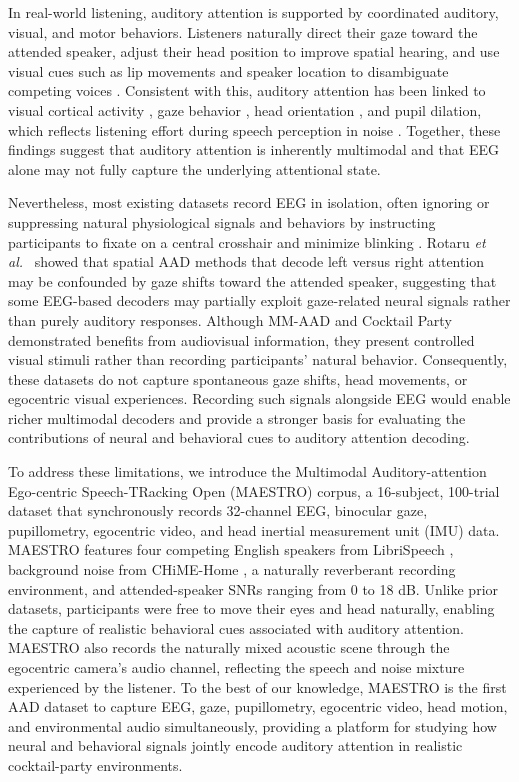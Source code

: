 \documentclass[journal]{IEEEtran}
\begin{document}
In real-world listening, auditory attention is supported by coordinated auditory, visual, and motor behaviors. Listeners naturally direct their gaze toward the attended speaker, adjust their head position to improve spatial hearing, and use visual cues such as lip movements and speaker location to disambiguate competing voices \cite{best2023effect, gehmacher2024eye, lertpoompunya2024head, wallach1940role, sumby1954visual, ahmed2023integration, xu2026utilizing}. Consistent with this, auditory attention has been linked to visual cortical activity \cite{golumbic2013}, gaze behavior \cite{hendrikse2019}, head orientation \cite{lertpoompunya2024head}, and pupil dilation, which reflects listening effort during speech perception in noise \cite{dimitrijevic2019neural, seifi2020exploratory}. Together, these findings suggest that auditory attention is inherently multimodal and that EEG alone may not fully capture the underlying attentional state.

Nevertheless, most existing datasets record EEG in isolation, often ignoring or suppressing natural physiological signals and behaviors by instructing participants to fixate on a central crosshair and minimize blinking \cite{esaa2022, lin2024}. Rotaru \textit{et al.}~\cite{rotaru2024} showed that spatial AAD methods that decode left versus right attention may be confounded by gaze shifts toward the attended speaker, suggesting that some EEG-based decoders may partially exploit gaze-related neural signals rather than purely auditory responses. Although MM-AAD \cite{mmaad2025} and Cocktail Party \cite{jaha2020visual} demonstrated benefits from audiovisual information, they present controlled visual stimuli rather than recording participants' natural behavior. Consequently, these datasets do not capture spontaneous gaze shifts, head movements, or egocentric visual experiences. Recording such signals alongside EEG would enable richer multimodal decoders and provide a stronger basis for evaluating the contributions of neural and behavioral cues to auditory attention decoding.

To address these limitations, we introduce the Multimodal Auditory-attention Ego-centric Speech-TRacking Open (MAESTRO) corpus, a 16-subject, 100-trial dataset that synchronously records 32-channel EEG, binocular gaze, pupillometry, egocentric video, and head inertial measurement unit (IMU) data. MAESTRO features four competing English speakers from LibriSpeech \cite{panayotov2015librispeech}, background noise from CHiME-Home \cite{foster2015chime}, a naturally reverberant recording environment, and attended-speaker SNRs ranging from 0 to 18 dB. Unlike prior datasets, participants were free to move their eyes and head naturally, enabling the capture of realistic behavioral cues associated with auditory attention. MAESTRO also records the naturally mixed acoustic scene through the egocentric camera's audio channel, reflecting the speech and noise mixture experienced by the listener. To the best of our knowledge, MAESTRO is the first AAD dataset to capture EEG, gaze, pupillometry, egocentric video, head motion, and environmental audio simultaneously, providing a platform for studying how neural and behavioral signals jointly encode auditory attention in realistic cocktail-party environments.
\end{document}
